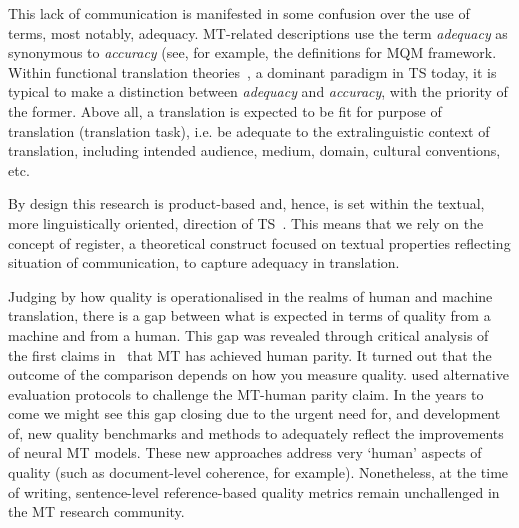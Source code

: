 This lack of communication is manifested in some confusion over the use of terms, most notably, adequacy. MT-related descriptions use the term \textit{adequacy} as synonymous to \textit{accuracy} (see, for example, the definitions for \gls{MQM} framework. Within functional translation theories~\cite[represented, for example, by][who developed the \textit{Scopos} theory by~\citet{Reiss1984}]{Nord1997,Vermeer1989}, a dominant paradigm in TS today, it is typical to make a distinction between \textit{adequacy} and \textit{accuracy}, with the priority of the former. Above all, a translation is expected to be fit for purpose of translation (translation task), i.e. be adequate to the extralinguistic context of translation, including intended audience, medium, domain, cultural conventions, etc.

By design this research is product-based and, hence, is set within the textual, more linguistically oriented, direction of TS~\cite[as opposed to cognitive, cultural and sociological branches, following disciplinary map of TS in][]{Chesterman2005}. This means that we rely on the concept of register, a theoretical construct focused on textual properties reflecting situation of communication, to capture adequacy in translation. 

Judging by how quality is operationalised in the realms of human and machine translation, there is a gap between what is expected in terms of quality from a machine and from a human. 
This gap was revealed through critical analysis of the first claims in~\citet{Hassan2018} that MT has achieved human parity. It turned out that the outcome of the comparison depends on how you measure quality. \citet{Laubli2018} used alternative evaluation protocols to challenge the MT-human parity claim.
In the years to come we might see this gap closing due to the urgent need for, and development of, new quality benchmarks and methods to adequately reflect the improvements of neural MT models. These new approaches address very `human' aspects of quality (such as document-level coherence, for example). Nonetheless, at the time of writing, sentence-level reference-based quality metrics remain unchallenged in the MT research community.


